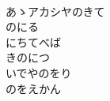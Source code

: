 \documentclass[10pt,b5j]{tarticle} %
\begin{document}
\begin{enumerate}
\begin{minipage}[c]{\blocksize}
        \vspace{\linespace}
        \item~\\
        あゝアカシヤのきて\\
        のにる\\
        にちてべば\\
        きのにつ\\
        いでやのをり\\
        のをえかん
    
    \end{minipage}
\end{enumerate} %
\end{document}
